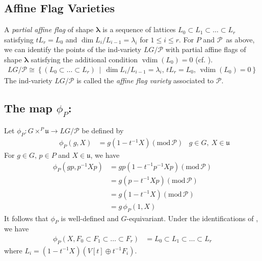 \documentclass[paper=a4, fontsize=10pt]{amsart} %
\theoremstyle{plain}
\theoremstyle{definition}
\theoremstyle{remark}
\numberwithin{equation}{section} %
\numberwithin{figure}{section} %
\numberwithin{table}{section} %
\numberwithin{subsection}{section} %
\def\mid{\,\middle\vert\,}
\def\gl{\ensuremath{G}}
\def\gL{\ensuremath{L\gl}}
\def\gLhat{\gL}
\def\para{\ensuremath{P}}
\def\Para{\ensuremath{\mathcal P}}
\def\u{\ensuremath{\mathfrak u}}
\def\mod{\ensuremath{\mathrm{mod}\,}}
\begin{document}
\subsection{Affine Flag Varieties}
A \emph{partial affine flag} of shape $\boldsymbol\lambda$ is a sequence of lattices $L_0\subset L_1\subset\ldots\subset L_r$ satisfying $tL_r=L_0$ and $\dim L_i/L_{i-1}=\lambda_i$ for $1\leq i\leq r$.
For $P$ and \Para\ as above, we can identify the points of the ind-variety $\gLhat/\Para$ with partial affine flags of shape $\boldsymbol\lambda$ satisfying the additional condition $\operatorname{vdim}(L_0)=0$ (cf. \cite{gf}).
\begin{align}\label{plfv}
\gLhat/\Para\cong\left\{(L_0\subset\ldots\subset L_r)\mid \dim L_i/L_{i-1}=\lambda_i,\,tL_r=L_0,\,\operatorname{vdim}(L_0)=0\right\}
\end{align}
The ind-variety $\gLhat/\Para$ is called the \emph{affine flag variety} associated to $\Para$.

\subsection{The map $\phi_\para$:}
\label{defnPhi}
Let $\phi_\para:\gl\times^\para\u\rightarrow\gLhat/\Para$ be defined by \begin{align*}
\hspace{40pt}    \phi_\para(g,X)&=g(1-t^{-1}X)(\mod\Para)  &g\in\gl,\ X\in\u
\end{align*}
For $g\in\gl,\,p\in\para$ and $X\in\u$, we have \begin{align*}
    \phi_\para\left(gp,p^{-1}X p\right) &=gp\left(1-t^{-1}p^{-1}Xp\right)(\mod\Para)   \\
                                        &=g\left(p-t^{-1}Xp\right)(\mod\Para)          \\
                                        &=g\left(1-t^{-1}X\right)(\mod\Para)            \\
                                        &=g\,\phi_\para\left(1,X\right)
\end{align*}
It follows that $\phi_\para$ is well-defined and \gl-equivariant.
Under the identifications of , we have\begin{align*}
    \phi_P(X,F_0\subset F_1\subset\ldots\subset F_r)&=L_0\subset L_1\subset\ldots\subset L_r
\end{align*}
where $L_i=\left(1-t^{-1}X\right)\left(V[t]\oplus t^{-1}F_i\right)$.
\end{document}
